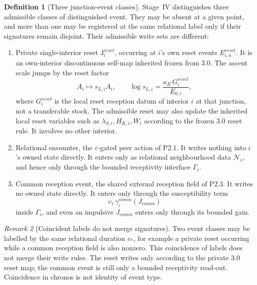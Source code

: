 \documentclass[11pt,a4paper]{article}
\def\mathfrak#1{#1}%
\def\mathrm#1{#1}%
\def\emph#1{#1}%
\theoremstyle{definition}
\newtheorem{definition}{Definition}[section]
\theoremstyle{plain}
\theoremstyle{remark}
\newtheorem{remark}[definition]{Remark}
\begin{document}
\begin{definition}[Three junction-event classes]\label{def:junctions}
Stage~IV distinguishes three admissible classes of distinguished event. They may
be absent at a given point, and more than one may be registered at the same
relational label only if their signatures remain disjoint. Their admissible write
sets are different:
\begin{enumerate}[label=\textup{(\arabic*)},leftmargin=1.2cm]
\item \emph{Private single-interior reset} \(\mathsf J^{\mathrm{reset}}_{i}\), occurring at
\(i\)'s own reset events \(E^{\mathrm{reset}}_{i,n}\). It is an own-interior
discontinuous self-map inherited frozen from 3.0. The ascent scale jumps by the
reset factor
\[
A_i\longmapsto s_{L,i}A_i,
\qquad
\log s_{L,i}
=
\frac{\kappa_R\,G_i^{\mathrm{reset}}}{E_{0,i}},
\]
where \(G_i^{\mathrm{reset}}\) is the local reset reception datum of interior \(i\)
at that junction, not a transferable stock. The admissible reset may also update
the inherited local reset variables such as \(\lambda_{S,i},H_{K,i},W_i\) according
to the frozen 3.0 reset rule. It involves no other interior.
\item \emph{Relational encounter}, the \(\varepsilon\)-gated peer action of P2.1.
It writes nothing into \(i\)'s owned state directly. It enters only as relational
neighbourhood data \(\mathcal N_i\), and hence only through the bounded
receptivity interface \(\Gamma_i\).
\item \emph{Common reception event}, the shared external reception field of P2.3.
It writes no owned state directly. It enters only through the susceptibility term
\[
\upsilon_i\,\gamma_i^{\mathrm{comm}}(J_{\mathrm{comm}})
\]
inside \(\Gamma_i\), and even an impulsive \(J_{\mathrm{comm}}\) enters only through
its bounded gain.
\end{enumerate}
\end{definition}

\begin{remark}[Coincident labels do not merge signatures]
Two event classes may be labelled by the same relational duration
\(\mathfrak c_*\), for example a private reset occurring while a common reception
field is also nonzero. This coincidence of labels does not merge their write rules.
The reset writes only according to the private 3.0 reset map; the common event is
still only a bounded receptivity read-out. Coincidence in chronos is not identity
of event type.
\end{remark}
\end{document}
